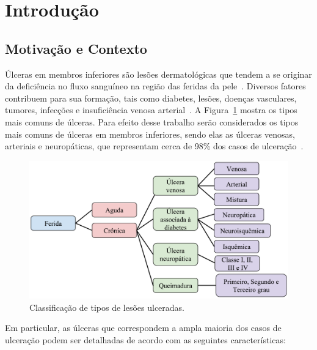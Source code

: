 \section{Introdução}

\subsection{Motivação e Contexto}

Úlceras em membros inferiores são lesões dermatológicas que tendem a se originar da deficiência no fluxo sanguíneo na região das feridas da pele~\cite{Pereira2011}.
Diversos fatores contribuem para sua formação, tais como diabetes, lesões, doenças vasculares, tumores, infecções e insuficiência venosa arterial~\cite{Ramelet2001}.
A Figura~\ref{fig:ulcerType} mostra os tipos mais comuns de úlceras. 
Para efeito desse trabalho serão considerados os tipos mais comuns de úlceras em membros inferiores, sendo elas as úlceras venosas, arteriais e neuropáticas, que representam cerca de 98\% dos casos de ulceração~\cite{Soutor2013}.

\begin{figure}[!htb]
    \centering
    \includegraphics[scale=.7]{_fig/ulcerType.pdf}
    \caption[Classificação da tipos de lesões ulceradas.]{Classificação de tipos de lesões ulceradas.}
    \label{fig:ulcerType}
\end{figure}

Em particular, as úlceras que correspondem a ampla maioria dos casos de ulceração podem ser detalhadas de acordo com as seguintes características:

